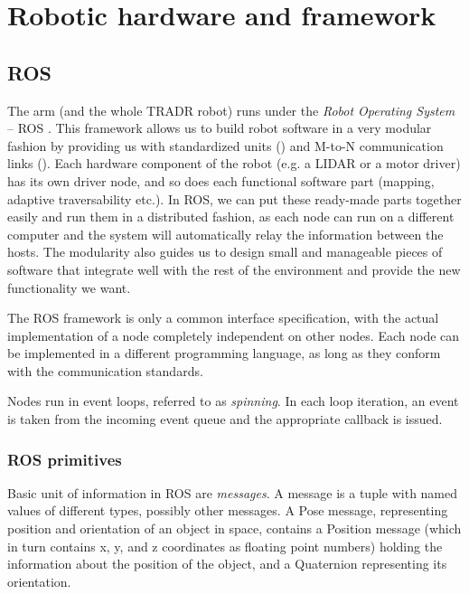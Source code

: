 \documentclass[buriama8_dp.tex]{subfiles}
\begin{document}
\chapter{Robotic hardware and framework}

\section{ROS}
\label{sec:ros}

The arm (and the whole TRADR robot) runs under the \emph{Robot Operating System} – ROS \cite{ros_paper}. This framework allows us to build robot software in a very modular fashion by providing us with standardized units () and M-to-N communication links (). Each hardware component of the robot (e.g. a LIDAR or a motor driver) has its own driver node, and so does each functional software part (mapping, adaptive traversability etc.). In ROS, we can put these ready-made parts together easily and run them in a distributed fashion, as each node can run on a different computer and the system will automatically relay the information between the hosts. The modularity also guides us to design small and manageable pieces of software that integrate well with the rest of the environment and provide the new functionality we want.

The ROS framework is only a common interface specification, with the actual implementation of a node completely independent on other nodes. Each node can be implemented in a different programming language, as long as they conform with the communication standards.

Nodes run in event loops, referred to as \emph{spinning}. In each loop iteration, an event is taken from the incoming event queue and the appropriate callback is issued.

\subsection{ROS primitives}
\label{subsec:ros_prims}

Basic unit of information in ROS are \emph{messages}. A message is a tuple with named values of different types, possibly other messages. A Pose message, representing position and orientation of an object in space, contains a Position message (which in turn contains \m x, \m y, and \m z coordinates as floating point numbers) holding the information about the position of the object, and a Quaternion representing its orientation.
\end{document}
